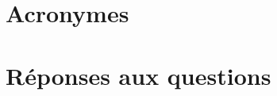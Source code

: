 \documentclass[11pt,fleqn]{book} %
\begin{document}
\chapter*{Acronymes}
\begin{multicols}{2}

\end{multicols}


















\immediate\closeout\tempfile
{}
\chapter{Réponses aux questions}


\printindex


\printbibliography
\end{document}
